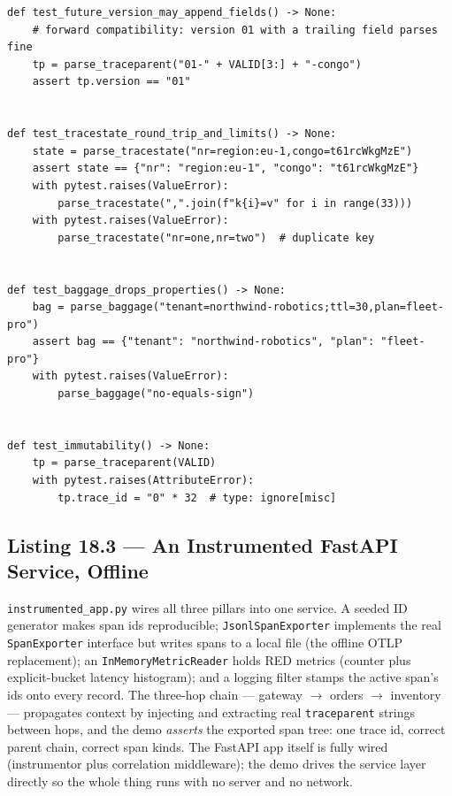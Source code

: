 \begin{verbatim}
def test_future_version_may_append_fields() -> None:
    # forward compatibility: version 01 with a trailing field parses fine
    tp = parse_traceparent("01-" + VALID[3:] + "-congo")
    assert tp.version == "01"


def test_tracestate_round_trip_and_limits() -> None:
    state = parse_tracestate("nr=region:eu-1,congo=t61rcWkgMzE")
    assert state == {"nr": "region:eu-1", "congo": "t61rcWkgMzE"}
    with pytest.raises(ValueError):
        parse_tracestate(",".join(f"k{i}=v" for i in range(33)))
    with pytest.raises(ValueError):
        parse_tracestate("nr=one,nr=two")  # duplicate key


def test_baggage_drops_properties() -> None:
    bag = parse_baggage("tenant=northwind-robotics;ttl=30,plan=fleet-pro")
    assert bag == {"tenant": "northwind-robotics", "plan": "fleet-pro"}
    with pytest.raises(ValueError):
        parse_baggage("no-equals-sign")


def test_immutability() -> None:
    tp = parse_traceparent(VALID)
    with pytest.raises(AttributeError):
        tp.trace_id = "0" * 32  # type: ignore[misc]
\end{verbatim}

\subsection{Listing 18.3 --- An Instrumented FastAPI Service, Offline}
\label{subsec:ch18-listing-app}

\texttt{instrumented\_app.py} wires all three pillars into one service. A
seeded ID generator makes span ids reproducible; \texttt{JsonlSpanExporter}
implements the real \texttt{SpanExporter} interface but writes spans to a
local file (the offline OTLP replacement); an \texttt{InMemoryMetricReader}
holds RED metrics (counter plus explicit-bucket latency histogram); and a
logging filter stamps the active span's ids onto every record. The
three-hop chain --- gateway $\to$ orders $\to$ inventory --- propagates
context by injecting and extracting real \texttt{traceparent} strings
between hops, and the demo \emph{asserts} the exported span tree: one trace
id, correct parent chain, correct span kinds. The FastAPI app itself is
fully wired (instrumentor plus correlation middleware); the demo drives the
service layer directly so the whole thing runs with no server and no
network.

